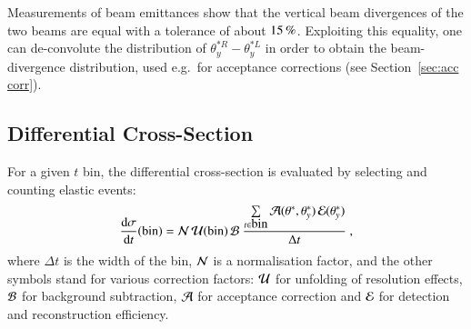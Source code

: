 Measurements of beam emittances show that the vertical beam divergences of the two beams are equal with a tolerance of about $15\,{\rm \%}$. Exploiting this equality, one can de-convolute the distribution of $\theta_y^{*R} - \theta_y^{*L}$ in order to obtain the beam-divergence distribution, used e.g.~for acceptance corrections (see Section~\ref{sec:acc corr}).

\subsection{Differential Cross-Section}
\label{sec:diff cs}

For a given $t$ bin, the differential cross-section is evaluated by selecting and counting elastic events:
\begin{equation}
{\d\sigma\over \d t}(\hbox{bin}) =
	{\cal N}\, {\cal U}({\rm bin})\, {\cal B}\ 
	{\sum\limits_{t \in \hbox{bin}} {\cal A}(\theta^*, \theta_y^*)\, {\cal E}(\theta_y^*)\over \Delta t}\ ,
\end{equation}
where $\Delta t$ is the width of the bin, ${\cal N}$ is a normalisation factor, 
and the other symbols stand for various correction factors:
${\cal U}$ for unfolding of resolution effects, ${\cal B}$ for background subtraction, ${\cal A}$ for acceptance correction and ${\cal E}$ for detection and reconstruction efficiency.

